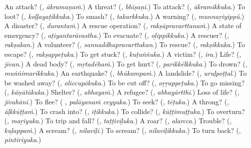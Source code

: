 \begin{tcolorbox}[breakable,colback=teal!4,colframe=teal!35!black,title={Before you move on}]
An attack? (\textbf{}, \emph{ākramaṇaṁ}.) A threat? (\textbf{}, \emph{bhīṣaṇi}.) To attack? (\textbf{}, \emph{ākramikkuka}.) To loot? (\textbf{}, \emph{koḷḷayaṭikkuka}.) To smash? (\textbf{}, \emph{takarkkuka}.) A warning? (\textbf{}, \emph{munnaṟiyippŭ}.) A disaster? (\textbf{}, \emph{durantaṁ}.) A rescue operation? (\textbf{}, \emph{rakṣāpravarttanaṁ}.) A state of emergency? (\textbf{}, \emph{aṭiyantarāvastha}.) To evacuate? (\textbf{}, \emph{oḻippikkuka}.) A rescuer? (\textbf{}, \emph{rakṣakan}.) A volunteer? (\textbf{}, \emph{sannaddhapravarttakan}.) To rescue? (\textbf{}, \emph{rakṣikkuka}.) To escape? (\textbf{}, \emph{rakṣappeṭuka}.) To get stuck? (\textbf{}, \emph{kuṭuṅṅuka}.) A victim? (\textbf{}, \emph{ira}.) Life? (\textbf{}, \emph{jīvan}.) A dead body? (\textbf{}, \emph{mṛtadēhaṁ}.) To get hurt? (\textbf{}, \emph{parikkēlkkuka}.) To drown? (\textbf{}, \emph{muṅṅimarikkuka}.) An earthquake? (\textbf{}, \emph{bhūkampaṁ}.) A landslide? (\textbf{}, \emph{uruḷpoṭṭal}.) To be washed away? (\textbf{}, \emph{oliccupōkuka}.) To be cut off? (\textbf{}, \emph{oṟṟappeṭuka}.) To go missing? (\textbf{}, \emph{kāṇātākuka}.) Shelter? (\textbf{}, \emph{abhayaṁ}.) A refugee? (\textbf{}, \emph{abhayārtthi}.) Loss of life? (\textbf{}, \emph{jīvahāni}.) To flee? (\textbf{ }, \emph{palāyanaṁ ceyyuka}.) To seek? (\textbf{}, \emph{tēṭuka}.) A throng? (\textbf{}, \emph{āḷkkūṭṭaṁ}.) To crash into? (\textbf{}, \emph{iṭikkuka}.) To collide? (\textbf{}, \emph{kūṭṭimuṭṭuka}.) To overturn? (\textbf{}, \emph{maṟiyuka}.) To trip and fall? (\textbf{}, \emph{taṭṭivīḻuka}.) A roar? (\textbf{}, \emph{alarcca}.) Trouble? (\textbf{}, \emph{kuḻappaṁ}.) A scream? (\textbf{}, \emph{nilaviḷi}.) To scream? (\textbf{}, \emph{nilaviḷikkuka}.) To turn back? (\textbf{}, \emph{pintiriyuka}.)
\end{tcolorbox}
